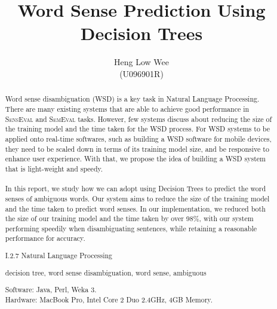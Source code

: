 \documentclass[urop]{socreport}
\begin{document}
\title{Word Sense Prediction Using Decision Trees}
\author{Heng Low Wee \\ (U096901R)}
\maketitle
\begin{abstract}
\paragraph{}
Word sense disambiguation (WSD) is a key task in Natural Language Processing. There are many existing systems that are able to achieve good performance in \textsc{SensEval} and \textsc{SemEval} tasks. However, few systems discuss about reducing the size of the training model and the time taken for the WSD process. For WSD systems to be applied onto real-time softwares, such as building a WSD software for mobile devices, they need to be scaled down in terms of its training model size, and be responsive to enhance user experience. With that, we propose the idea of building a WSD system that is light-weight and speedy.

\paragraph{}
In this report, we study how we can adopt using Decision Trees to predict the word senses of ambiguous words. Our system aims to reduce the size of the training model and the time taken to predict word senses. In our implementation, we reduced both the size of our training model and the time taken by over 98\%, with our system performing speedily when disambiguating sentences, while retaining a reasonable performance for accuracy.

\begin{descriptors}
	\item I.2.7 Natural Language Processing
\end{descriptors}
\begin{keywords}
	decision tree,  word sense disambiguation, word sense, ambiguous
\end{keywords}
\begin{implement}
\begin{flushleft}
\hspace{5 mm}Software: Java, Perl, Weka 3.\\
\hspace{5 mm}Hardware: MacBook Pro, Intel Core 2 Duo 2.4GHz, 4GB Memory.
\end{flushleft}
\end{implement}
\end{abstract}
\end{document}
